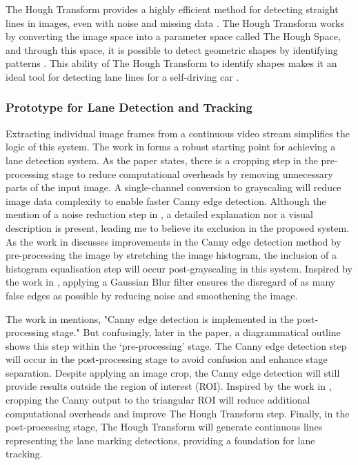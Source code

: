 \documentclass[9pt,conference]{IEEEtran}
\begin{document}
The Hough Transform provides a highly efficient method for detecting straight lines in images, even with noise and missing data \cite{b4}. The Hough Transform works by converting the image space into a parameter space called The Hough Space, and through this space, it is possible to detect geometric shapes by identifying patterns \cite{b5}. This ability of The Hough Transform to identify shapes makes it an ideal tool for detecting lane lines for a self-driving car \cite{b6}.

\subsubsection{Prototype for Lane Detection and Tracking}

Extracting individual image frames from a continuous video stream simplifies the logic of this system. The work in \cite{b3} forms a robust starting point for achieving a lane detection system. As the paper states, there is a cropping step in the pre-processing stage to reduce computational overheads by removing unnecessary parts of the input image. A single-channel conversion to grayscaling will reduce image data complexity to enable faster Canny edge detection. Although the mention of a noise reduction step in \cite{b3}, a detailed explanation nor a visual description is present, leading me to believe its exclusion in the proposed system. As the work in \cite{b7} discusses improvements in the Canny edge detection method by pre-processing the image by stretching the image histogram, the inclusion of a histogram equalisation step will occur post-grayscaling in this system. Inspired by the work in \cite{b6}, applying a Gaussian Blur filter ensures the disregard of as many false edges as possible by reducing noise and smoothening the image.

The work in \cite{b3} mentions, "Canny edge detection is implemented in the post-processing stage." But confusingly, later in the paper, a diagrammatical outline shows this step within the `pre-processing' stage. The Canny edge detection step will occur in the post-processing stage to avoid confusion and enhance stage separation. Despite applying an image crop, the Canny edge detection will still provide results outside the region of interest (ROI). Inspired by the work in \cite{b6}, cropping the Canny output to the triangular ROI will reduce additional computational overheads and improve The Hough Transform step. Finally, in the post-processing stage, The Hough Transform will generate continuous lines representing the lane marking detections, providing a foundation for lane tracking.
\end{document}
